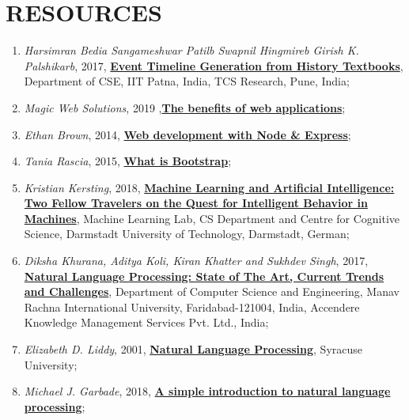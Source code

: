 \documentclass{report}
\begin{document}
\section* {RESOURCES}
\begin{enumerate}
\item \textit{Harsimran Bedia Sangameshwar Patilb Swapnil Hingmireb Girish K. Palshikarb},  2017, \href{https://aclweb.org/anthology/W17-5912}{\textbf{Event Timeline Generation from History Textbooks}}, Department of CSE, IIT Patna, India, TCS Research, Pune, India;

\item \textit{Magic Web Solutions}, 2019 ,\href{https://www.magicwebsolutions.co.uk/blog/the-benefits-of-web-based-applications.htm}{\textbf{The benefits of web applications}};

\item \textit{Ethan Brown}, 2014, \href{http://www.vanmeegern.de/fileadmin/user_upload/PDF/Web_Development_with_Node_Express.pdf}{\textbf{Web development with Node \& Express}};

\item \textit{Tania Rascia}, 2015, \href{https://www.taniarascia.com/what-is-bootstrap-and-how-do-i-use-it/}{\textbf{What is Bootstrap}};

\item \textit{Kristian Kersting}, 2018, \href{https://ml-research.github.io/papers/kersting2018aiml_frontiers.pdf}{\textbf{Machine Learning and Artificial Intelligence: Two Fellow Travelers on the Quest for Intelligent Behavior in Machines}}, Machine Learning Lab, CS Department and Centre for Cognitive Science, Darmstadt University of Technology, Darmstadt, German;

\item \textit{Diksha Khurana, Aditya Koli, Kiran Khatter and Sukhdev Singh}, 2017, \href{https://arxiv.org/ftp/arxiv/papers/1708/1708.05148.pdf}{\textbf{Natural Language Processing: State of The Art, Current Trends and Challenges}}, Department of Computer Science and Engineering, Manav Rachna International University, Faridabad-121004, India, Accendere Knowledge Management Services Pvt. Ltd., India;

\item \textit{Elizabeth D. Liddy}, 2001, \href{https://surface.syr.edu/cgi/viewcontent.cgi?article=1043&context=istpub} {\textbf{Natural Language Processing}}, Syracuse University;

\item \textit{Michael J. Garbade}, 2018, \href{https://becominghuman.ai/a-simple-introduction-to-natural-language-processing-ea66a1747b32}{\textbf{A simple introduction to natural language processing}};


\end{enumerate}
\end{document}
